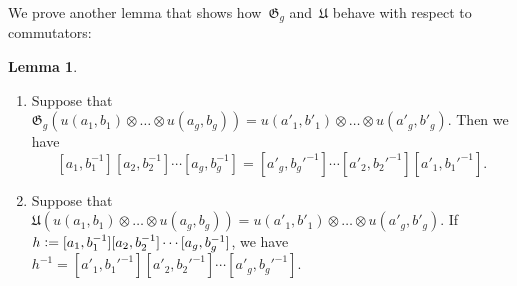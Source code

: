 \documentclass[12pt]{article}
\newcounter{num}
\theoremstyle{definition}
\newtheorem{Lemma}[Satz]{Lemma}
\theoremstyle{break}
\newcommand{\fG}{\mathfrak{G}}
\newcommand{\fU}{\mathfrak{U}}
\renewcommand{\1}{\mathbbm{1}}
\newcommand{\ot}{\mathbin{\otimes}}
\newcommand{\uu}{u}
\newcommand{\deq}{\vcentcolon =}
\begin{document}
We prove another lemma that shows how~$\fG_g$ and~$\fU$ behave with respect to commutators:
\begin{Lemma} \label{GUComm}
\begin{enumerate}
\item
Suppose that
$\fG_g(\uu(a_1,b_1) \ot \dots \ot \uu(a_g,b_g)) =
\uu(a'_1,b'_1) \ot \dots \ot \uu(a'_g,b'_g)$. Then we have
\[[a_1,b_1^{-1}][a_2,b_2^{-1}] \cdots [a_g,b_g^{-1}]
= [a'_g,b_g'^{-1}]  \cdots [a'_2,b_2'^{-1}][a'_1,b_1'^{-1}]. \]

\item
Suppose that
$\fU(\uu(a_1,b_1) \ot \dots \ot \uu(a_g,b_g)) =
\uu(a'_1,b'_1) \ot \dots \ot \uu(a'_g,b'_g)$. If
$h \deq [a_1,b_1^{-1}][a_2,b_2^{-1}] \cdots [a_g,b_g^{-1}]$, we have
$h^{-1} = [a'_1,b_1'^{-1}][a'_2,b_2'^{-1}] \cdots [a'_g,b_g'^{-1}]$.
\end{enumerate}
\end{Lemma}
\end{document}
